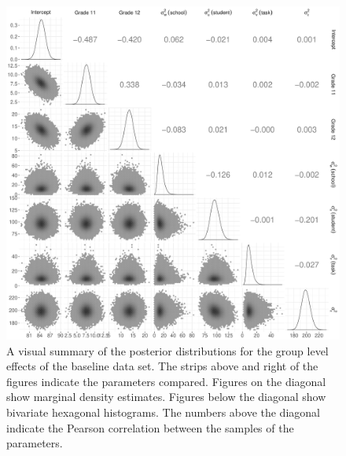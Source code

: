 \documentclass[a4paper]{article}
\begin{document}
\begin{figure}[!ht]
	\includegraphics[width=\textwidth]{posteriorDescriptivesBaseline}
	\caption{A visual summary of the posterior distributions for the group level effects of the baseline data set. The strips above and right of the figures indicate the parameters compared. Figures on the diagonal show marginal density estimates. Figures below the diagonal show bivariate hexagonal histograms. The numbers above the diagonal indicate the Pearson correlation between the samples of the parameters.}
	\label{fig:baselinePosteriorDescriptives}
\end{figure}
\end{document}
